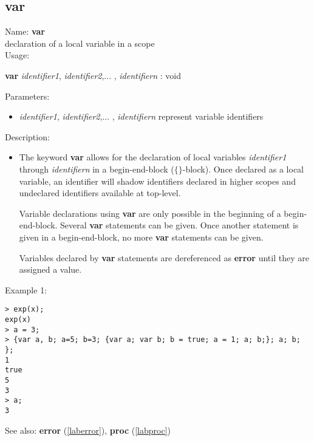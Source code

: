 \subsection{var}
\label{labvar}
\noindent Name: \textbf{var}\\
\phantom{aaa}declaration of a local variable in a scope\\[0.2cm]
\noindent Usage: 
\begin{center}
\textbf{var} \emph{identifier1}, \emph{identifier2},... , \emph{identifiern} : \textsf{void}\\
\end{center}
Parameters: 
\begin{itemize}
\item \emph{identifier1}, \emph{identifier2},... , \emph{identifiern} represent variable identifiers
\end{itemize}
\noindent Description: \begin{itemize}

\item The keyword \textbf{var} allows for the declaration of local variables
   \emph{identifier1} through \emph{identifiern} in a begin-end-block ($\lbrace \rbrace$-block).
   Once declared as a local variable, an identifier will shadow
   identifiers declared in higher scopes and undeclared identifiers
   available at top-level.
    
   Variable declarations using \textbf{var} are only possible in the
   beginning of a begin-end-block. Several \textbf{var} statements can be
   given. Once another statement is given in a begin-end-block, no more
   \textbf{var} statements can be given.
    
   Variables declared by \textbf{var} statements are dereferenced as \textbf{error}
   until they are assigned a value. 
\end{itemize}
\noindent Example 1: 
\begin{center}\begin{minipage}{15cm}\begin{Verbatim}[frame=single,commandchars=\\\|\~]
> exp(x); 
exp(x)
> a = 3; 
> {var a, b; a=5; b=3; {var a; var b; b = true; a = 1; a; b;}; a; b; }; 
1
true
5
3
> a;
3
\end{Verbatim}
\end{minipage}\end{center}
See also: \textbf{error} (\ref{laberror}), \textbf{proc} (\ref{labproc})
